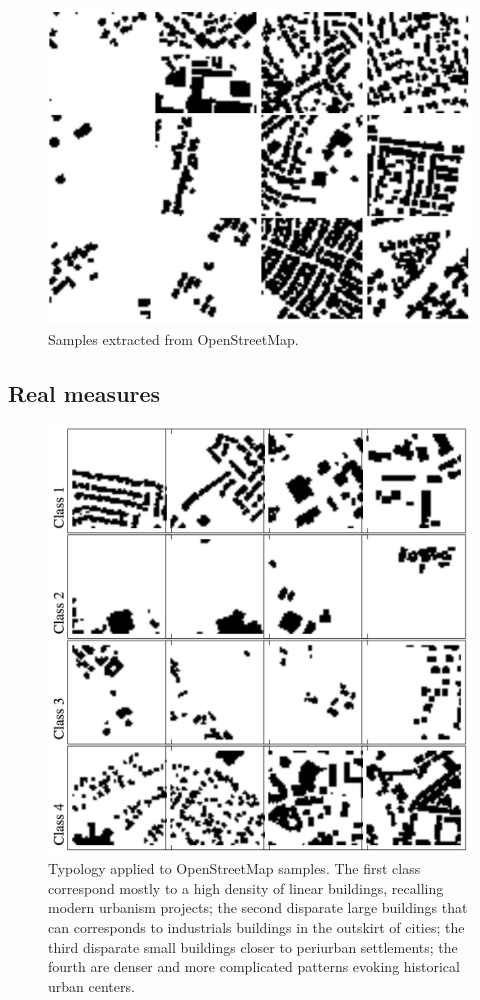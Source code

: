 \documentclass[letterpaper]{article}
\begin{document}
\begin{figure}
    \centering
    \includegraphics[width=\linewidth]{fig2.png}
        \caption{Samples extracted from OpenStreetMap.}
    \label{fig:osm}
\end{figure}

\subsection{Real measures}



\begin{figure}
\vspace{-1cm}
  \centering
  \includegraphics[width=0.57\linewidth]{fig3}
    \caption{Typology applied to OpenStreetMap samples. The first class correspond mostly to a high density of linear buildings, recalling modern urbanism projects; the second disparate large buildings that can corresponds to industrials buildings in the outskirt of cities; the third disparate small buildings closer to periurban settlements; the fourth are denser and more complicated patterns evoking historical urban centers.}
  \label{fig:osm_types}
\end{figure}
\end{document}
